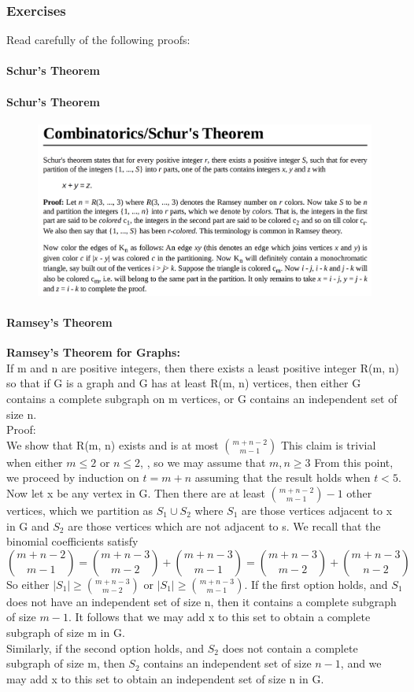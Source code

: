 \documentclass{article}
\begin{document}
\subsubsection{Exercises}
Read carefully of the following proofs:
\paragraph{\textbf{Schur’s Theorem}}
\paragraph{Schur’s Theorem}
\begin{figure}[H]
    \centering
    \includegraphics{0123}
\end{figure}
\paragraph{Ramsey’s Theorem}
\textbf{Ramsey’s Theorem for Graphs:}\\
If m and n are positive integers, then there
exists a least positive integer R(m, n) so that if G is a graph and G has at least R(m, n) vertices, then either G contains a complete subgraph on m vertices, or G contains an independent set of size n.\\
Proof:\\
We show that R(m, n) exists and is at most $\binom{m+n-2}{m-1}$ This claim is trivial when either $m\leq 2$ or $n\leq 2$, , so we may assume that $m,n\ge 3$ From this point, we proceed by induction on $t=m+n$ assuming that the result holds when $t<5$.\\
Now let x be any vertex in G. Then there are at least $\binom{m+n-2}{m-1}-1$ other vertices, which we partition as $S_1\cup S_2$ where $S_1$ are those vertices adjacent to x in G and $S_2$ are those vertices which are not adjacent to s. We recall that the binomial coefficients satisfy
$$\binom{m+n-2}{m-1}=\binom{m+n-3}{m-2}+\binom{m+n-3}{m-1}=\binom{m+n-3}{m-2}+\binom{m+n-3}{n-2}$$
So either $|S_1|\ge \binom{m+n-3}{m-2}$ or $|S_1|\ge \binom{m+n-3}{m-1}$.  If the first option holds, and $S_1$ does not have an independent set of size n, then it contains a complete subgraph of size $m - 1$. It follows that we may add x to this set to obtain a complete subgraph of size m in G.\\
Similarly, if the second option holds, and $S_2$ does not contain a complete subgraph
of size m, then $S_2$ contains an independent set of size $n - 1$, and we may add x to this set to obtain an independent set of size n in G. 
\end{document}
